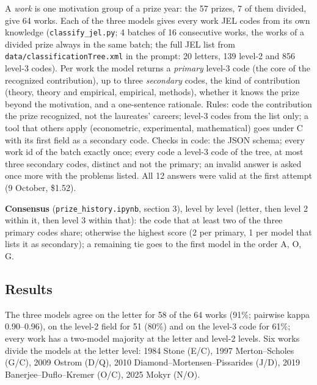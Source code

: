 \documentclass[11pt,a4paper]{article}
\newcommand{\code}[1]{\texttt{#1}}
\begin{document}
A \emph{work} is one motivation group of a prize year: the 57 prizes, 7 of them divided, give 64 works. Each of the
three models gives every work JEL codes from its own knowledge (\code{classify\_jel.py}; 4 batches of 16 consecutive
works, the works of a divided prize always in the same batch; the full JEL list from \code{data/classificationTree.xml}
in the prompt: 20 letters, 139 level-2 and 856 level-3 codes). Per work the model returns a \emph{primary} level-3
code (the core of the recognized contribution), up to three \emph{secondary} codes, the kind of contribution (theory,
theory and empirical, empirical, methods), whether it knows the prize beyond the motivation, and a one-sentence
rationale. Rules: code the contribution the prize recognized, not the laureates' careers; level-3 codes from the list
only; a tool that others apply (econometric, experimental, mathematical) goes under C with its first field as a
secondary code. Checks in code: the JSON schema; every work id of the batch exactly once; every code a level-3 code of
the tree, at most three secondary codes, distinct and not the primary; an invalid answer is asked once more with the
problems listed. All 12 answers were valid at the first attempt (9 October, \$1.52).

\textbf{Consensus} (\code{prize\_history.ipynb}, section 3), level by level (letter, then level 2 within it, then
level 3 within that): the code that at least two of the three primary codes share; otherwise the highest score (2 per
primary, 1 per model that lists it as secondary); a remaining tie goes to the first model in the order A, O, G.

\subsection{Results}

The three models agree on the letter for 58 of the 64 works (91\%; pairwise kappa 0.90--0.96), on the level-2 field
for 51 (80\%) and on the level-3 code for 61\%; every work has a two-model majority at the letter and level-2 levels.
Six works divide the models at the letter level: 1984 Stone (E/C), 1997 Merton--Scholes (G/C), 2009 Ostrom (D/Q),
2010 Diamond--Mortensen--Pissarides (J/D), 2019 Banerjee--Duflo--Kremer (O/C), 2025 Mokyr (N/O).
\end{document}
